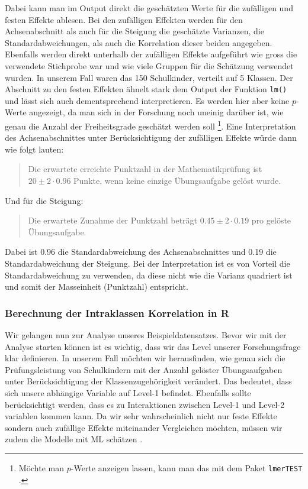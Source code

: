 \documentclass[12pt]{article}\usepackage[]{graphicx}\usepackage[]{color}
\begin{document}
Dabei kann man im Output direkt die geschätzten Werte für die zufälligen und festen Effekte ablesen. Bei den zufälligen Effekten werden für den Achsenabschnitt als auch für die Steigung die geschätzte Varianzen, die Standardabweichungen, als auch die Korrelation dieser beiden angegeben. Ebenfalls werden direkt unterhalb der zufälligen Effekte aufgeführt wie gross die verwendete Stichprobe war und wie viele Gruppen für die Schätzung verwendet wurden. In unserem Fall waren das 150 Schulkinder, verteilt auf 5 Klassen. Der Abschnitt zu den festen Effekten ähnelt stark dem Output der Funktion \texttt{lm()} und lässt sich auch dementsprechend interpretieren. Es werden hier aber keine $p$-Werte angezeigt, da man sich in der Forschung noch uneinig darüber ist, wie genau die Anzahl der Freiheitsgrade geschätzt werden soll \citep{PEUGH201085,SnijdersTomA.B2012Ma:a}\footnote{Möchte man $p$-Werte anzeigen lassen, kann man das mit dem Paket \texttt{lmerTEST} \citep{lmertest}.}. Eine Interpretation des Achsenabschnittes unter Berücksichtigung der zufälligen Effekte würde dann wie folgt lauten: 
\begin{quote}
Die erwartete erreichte Punktzahl in der Mathematikprüfung ist $20 \pm 2 \cdot 0.96$ Punkte, wenn keine einzige Übungsaufgabe gelöst wurde.
\end{quote}
Und für die Steigung:
\begin{quote}
Die erwartete Zunahme der Punktzahl beträgt $0.45 \pm 2 \cdot 0.19$ pro gelöste Übungsaufgabe.
\end{quote}
Dabei ist 0.96 die Standardabweichung des Achsenabschnittes und 0.19 die Standardabweichung der Steigung. Bei der Interpretation ist es von Vorteil die Standardabweichung zu verwenden, da diese nicht wie die Varianz quadriert ist und somit der Masseinheit (Punktzahl) entspricht. 

\subsubsection{Berechnung der Intraklassen Korrelation in R} \label{section:icc_r}
Wir gelangen nun zur Analyse unseres Beispieldatensatzes. Bevor wir mit der Analyse starten können ist es wichtig, dass wir das Level unserer Forschungsfrage klar definieren. In unserem Fall möchten wir herausfinden, wie genau sich die Prüfungsleistung von Schulkindern mit der Anzahl gelöster Übungsaufgaben unter Berücksichtigung der Klassenzugehörigkeit verändert. Das bedeutet, dass sich unsere abhängige Variable auf Level-1 befindet. Ebenfalls sollte berücksichtigt werden, dass es zu Interaktionen zwischen Level-1 und Level-2 variablen kommen kann. Da wir sehr wahrscheinlich nicht nur feste Effekte sondern auch zufällige Effekte miteinander Vergleichen möchten, müssen wir zudem die Modelle mit ML schätzen \citep{PEUGH201085}. 
\end{document}
